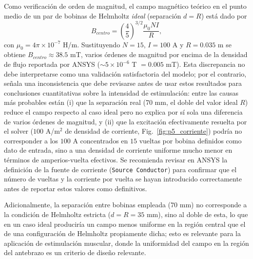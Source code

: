 \documentclass[conference]{IEEEtran}
\begin{document}
Como verificación de orden de magnitud, el campo magnético teórico en el punto medio de un par de bobinas de Helmholtz \emph{ideal} (separación $d=R$) está dado por
\[
B_{centro} = \left(\frac{4}{5}\right)^{3/2}\frac{\mu_0 N I}{R},
\]
con $\mu_0=4\pi\times10^{-7}$ H/m. Sustituyendo $N=15$, $I=100$ A y $R=0.035$ m se obtiene $B_{centro}\approx 38.5$ mT, varios órdenes de magnitud por encima de la densidad de flujo reportada por ANSYS ($\sim\!5\times10^{-6}$ T $=0.005$ mT). Esta discrepancia no debe interpretarse como una validación satisfactoria del modelo; por el contrario, señala una inconsistencia que debe revisarse antes de usar estos resultados para conclusiones cuantitativas sobre la intensidad de estimulación: entre las causas más probables están (i) que la separación real (70 mm, el doble del valor ideal $R$) reduce el campo respecto al caso ideal pero no explica por sí sola una diferencia de varios órdenes de magnitud, y (ii) que la excitación efectivamente resuelta por el solver ($100$ A/m$^2$ de densidad de corriente, Fig.~\ref{fig:p5_corriente}) podría no corresponder a los $100$ A concentrados en $15$ vueltas por bobina definidos como dato de entrada, sino a una densidad de corriente uniforme mucho menor en términos de amperios-vuelta efectivos. Se recomienda revisar en ANSYS la definición de la fuente de corriente (\texttt{Source Conductor}) para confirmar que el número de vueltas y la corriente por vuelta se hayan introducido correctamente antes de reportar estos valores como definitivos.

Adicionalmente, la separación entre bobinas empleada (70 mm) no corresponde a la condición de Helmholtz estricta ($d=R=35$ mm), sino al doble de esta, lo que en un caso ideal produciría un campo menos uniforme en la región central que el de una configuración de Helmholtz propiamente dicha; esto es relevante para la aplicación de estimulación muscular, donde la uniformidad del campo en la región del antebrazo es un criterio de diseño relevante.
\end{document}
